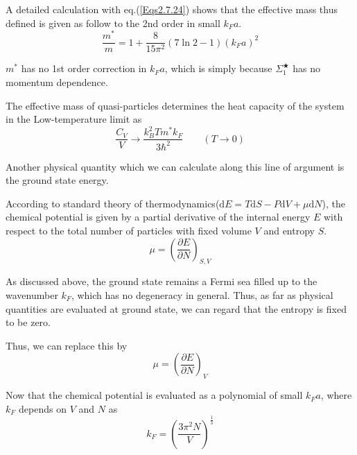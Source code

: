 A detailed calculation with eq.(\ref{Eqs2.7.24}) shows that the effective mass thus defined is given as follow to the 2nd order in small $k_F a$.
\begin{equation} \label{Eqs2.7.37}
\frac{m^{*}}{m} = 1+ \frac{8}{15\pi^2}(7 \ln2 -1)(k_F a)^2
\end{equation}

$m^{*}$ has no 1st order correction in $k_F a$, which is simply because $\Sigma_1^{\bigstar}$ has no momentum dependence.

The effective mass of quasi-particles determines the heat capacity of the system in the Low-temperature limit as
\begin{equation} \label{Eqs2.7.38}
\frac{C_V}{V} \rightarrow \frac{k_B^2 T m^{*} k_F}{3\hbar^2}\qquad(T \rightarrow 0)
\end{equation}

Another physical quantity which we can calculate along this line of argument is the ground state energy.

According to standard theory of thermodynamics($\mathrm{d}E=T\mathrm{d}S-P\mathrm{d}V+\mu\mathrm{d}N$), the chemical potential is given by a partial derivative of the internal energy $E$ with respect to the total number of particles with fixed volume $V$ and entropy $S$.
\begin{equation} \label{Eqs2.7.39}
\mu = \left( \frac{\partial E}{\partial N} \right)_{S,V}
\end{equation}

As discussed above, the ground state remains a Fermi sea filled up to the wavenumber $k_F$, which has no degeneracy in general. Thus, as far as physical quantities are evaluated at ground state, we can regard that the entropy is fixed to be zero.

Thus, we can replace this by
\[ \mu = \left( \frac{\partial E}{\partial N} \right)_{V} \]

Now that the chemical potential is evaluated as a polynomial of small $k_F a$, where $k_F$ depends on $V$ and $N$ as 
\begin{equation} \label{Eqs2.7.40}
k_F = \left( \frac{3\pi^2 N}{V} \right)^{\frac{1}{3}} \end{equation}

